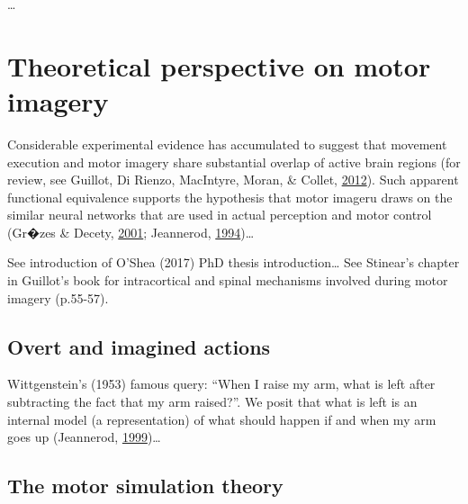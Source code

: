 \documentclass[a4paper,12pt,twoside,openright,oldfontcommands]{memoir}
\begin{document}
\ldots{}

\hypertarget{theoretical-perspective-on-motor-imagery}{%
\section{Theoretical perspective on motor imagery}\label{theoretical-perspective-on-motor-imagery}}

Considerable experimental evidence has accumulated to suggest that movement execution and motor imagery share substantial overlap of active brain regions (for review, see Guillot, Di Rienzo, MacIntyre, Moran, \& Collet, \protect\hyperlink{ref-guillot_imagining_2012}{2012}). Such apparent functional equivalence supports the hypothesis that motor imageru draws on the similar neural networks that are used in actual perception and motor control (Gr�zes \& Decety, \protect\hyperlink{ref-grzes_functional_2001}{2001}; Jeannerod, \protect\hyperlink{ref-jeannerod_representing_1994}{1994})\ldots{}

See introduction of O'Shea (2017) PhD thesis introduction\ldots{} See Stinear's chapter in Guillot's book for intracortical and spinal mechanisms involved during motor imagery (p.55-57).

\hypertarget{overt-and-imagined-actions}{%
\subsection{Overt and imagined actions}\label{overt-and-imagined-actions}}

Wittgenstein's (1953) famous query: \enquote{When I raise my arm, what is left after subtracting the fact that my arm raised?}. We posit that what is left is an internal model (a representation) of what should happen if and when my arm goes up (Jeannerod, \protect\hyperlink{ref-jeannerod_25th_1999}{1999})\ldots{}

\hypertarget{the-motor-simulation-theory}{%
\subsection{The motor simulation theory}\label{the-motor-simulation-theory}}
\end{document}
